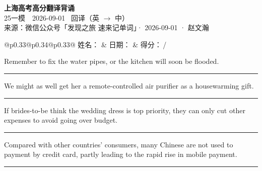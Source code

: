 \documentclass[11pt,a4paper]{article}
\newcommand{\num}[1]{\makebox[1.9em][r]{#1.}\hspace{0.3em}}
\newcommand{\wline}{\noindent\rule{\linewidth}{0.4pt}}
\begin{document}
\pagestyle{plain}
\begin{center}
{\LARGE\bfseries 上海高考高分翻译背诵 }\\[0.25em]
{\large 25一模　2026-09-01 \quad\ 回译（英 $\to$ 中）}\\[0.35em]
{\footnotesize 来源：微信公众号「发现之旅 速来记单词」· 2026-09-01 · 赵文瀚}
\end{center}

\vspace{0.4em}
\noindent\begin{tabular}{@{}p{0.33\textwidth}@{}p{0.34\textwidth}@{}p{0.33\textwidth}@{}}
姓名：\underline{\hspace{2.0cm}} & 日期：\underline{\hspace{2.0cm}} & 得分：\underline{\hspace{1.4cm}}\,/ \\
\end{tabular}

\vspace{0.5em}

\vspace{0.8em}
\num{1}Remember to fix the water pipes, or the kitchen will soon be flooded.

\vspace{0.25em}

\wline

\num{2}We might as well get her a remote-controlled air purifier as a housewarming gift.

\vspace{0.25em}

\wline

\num{3}If brides-to-be think the wedding dress is top priority, they can only cut other expenses to avoid going over budget.

\vspace{0.25em}

\wline

\num{4}Compared with other countries’ consumers, many Chinese are not used to payment by credit card, partly leading to the rapid rise in mobile payment.

\vspace{0.25em}

\wline
\end{document}
